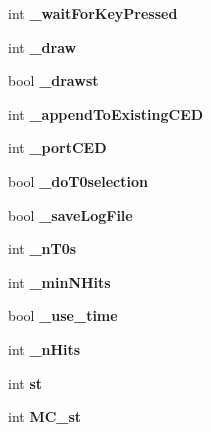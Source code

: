 \begin{DoxyCompactItemize}
\item 
int {\bfseries \-\_\-wait\-For\-Key\-Pressed}\label{classCALICE_1_1DEHEventDisplayProcessor_ac23ee5414f7dfee1ac7a1a964a47e43d}

\item 
int {\bfseries \-\_\-draw}\label{classCALICE_1_1DEHEventDisplayProcessor_a73cedbcb76c8729dc2505dae7ea59781}

\item 
bool {\bfseries \-\_\-drawst}\label{classCALICE_1_1DEHEventDisplayProcessor_abb9bbd4c81c80014a427d159f06ab665}

\item 
int {\bfseries \-\_\-append\-To\-Existing\-C\-E\-D}\label{classCALICE_1_1DEHEventDisplayProcessor_a065675fc34402136abccacad2972fafa}

\item 
int {\bfseries \-\_\-port\-C\-E\-D}\label{classCALICE_1_1DEHEventDisplayProcessor_a180e0db34944e7b648bf660ee8d22bef}

\item 
bool {\bfseries \-\_\-do\-T0selection}\label{classCALICE_1_1DEHEventDisplayProcessor_a4e6b1ea5cef1ae4b6fbbd6b5416f6676}

\item 
bool {\bfseries \-\_\-save\-Log\-File}\label{classCALICE_1_1DEHEventDisplayProcessor_a8212d153ec6124ecbb29e05cc606dbe2}

\item 
int {\bfseries \-\_\-n\-T0s}\label{classCALICE_1_1DEHEventDisplayProcessor_a70a1f949c685f2c50c96ba162b4ab4a9}

\item 
int {\bfseries \-\_\-min\-N\-Hits}\label{classCALICE_1_1DEHEventDisplayProcessor_a9b9bed227a184719f6bc60d5007ab93d}

\item 
bool {\bfseries \-\_\-use\-\_\-time}\label{classCALICE_1_1DEHEventDisplayProcessor_ac478a3791616d44bb295d4a362a40f34}

\item 
int {\bfseries \-\_\-n\-Hits}\label{classCALICE_1_1DEHEventDisplayProcessor_ad9e07963ec64eb57545a0d2dbc2287e1}

\item 
int {\bfseries st}\label{classCALICE_1_1DEHEventDisplayProcessor_ad0b8b037b954683d444d7380ca7e0687}

\item 
int {\bfseries M\-C\-\_\-st}\label{classCALICE_1_1DEHEventDisplayProcessor_aba9ff8366393bf786c70b55a30b3a712}


\end{DoxyCompactItemize}
